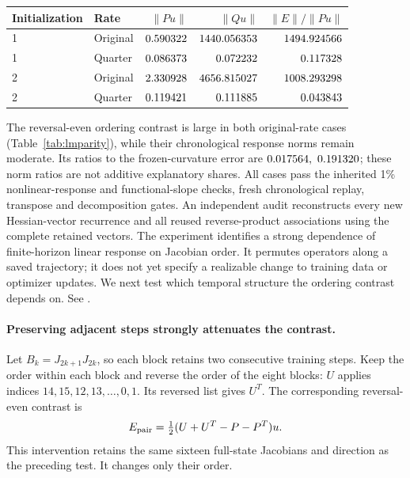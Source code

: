 \documentclass[11pt,letterpaper]{article}
\begin{document}
\par\medskip\noindent\begin{minipage}{\linewidth}
\captionsetup{hypcap=false}
\centering\small
\begin{tabular}{@{}llrrr@{}}
\toprule
Initialization & Rate & $\|Pu\|$ & $\|Qu\|$ & $\|E\|/\|Pu\|$ \\
\midrule
1 & Original & $0.590322$ & $1440.056353$ & $1494.924566$ \\
1 & Quarter & $0.086373$ & $0.072232$ & $0.117328$ \\
2 & Original & $2.330928$ & $4656.815027$ & $1008.293298$ \\
2 & Quarter & $0.119421$ & $0.111885$ & $0.043843$ \\
\bottomrule
\end{tabular}
\label{tab:lmparity}
\end{minipage}\par\medskip

The reversal-even ordering contrast is large in both original-rate cases
(Table~\ref{tab:lmparity}), while their chronological response norms remain
moderate. Its ratios to the frozen-curvature error are
$0.017564,\ 0.191320$; these norm ratios are not additive explanatory shares.
All cases pass the inherited 1\% nonlinear-response and functional-slope
checks, fresh chronological replay, transpose and decomposition gates.
An independent audit reconstructs every new Hessian-vector recurrence and
all reused reverse-product associations using the complete retained vectors.
The experiment identifies a strong dependence of finite-horizon linear
response on Jacobian order. It permutes operators along a saved trajectory;
it does not yet specify a realizable change to training data or optimizer
updates. We next test which temporal structure the ordering contrast depends on.
See .

\paragraph{Preserving adjacent steps strongly attenuates the contrast.}
Let $B_k=J_{2k+1}J_{2k}$, so each block retains two consecutive training steps.
Keep the order within each block and reverse the order of the eight blocks:
$U$ applies indices $14,15,12,13,\ldots,0,1$. Its reversed list gives $U^T$.
The corresponding reversal-even contrast is
\[
 E_{\rm pair}=\tfrac12(U+U^T-P-P^T)u.
\]
This intervention retains the same sixteen full-state Jacobians and direction
as the preceding test. It changes only their order.
\end{document}

